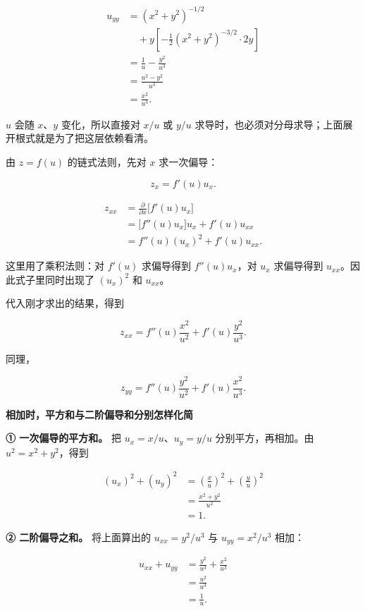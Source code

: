 \documentclass[UTF8,11pt,fontset=windows]{ctexart}
\begin{document}
$$
\begin{aligned}
u_{yy}
&=(x^2+y^2)^{-1/2}\\
&\quad+y\left[-\frac12(x^2+y^2)^{-3/2}\cdot2y\right]\\
&=\frac1u-\frac{y^2}{u^3}\\
&=\frac{u^2-y^2}{u^3}\\
&=\frac{x^2}{u^3}.
\end{aligned}
$$

$u$ 会随 $x$、$y$ 变化，所以直接对 $x/u$ 或 $y/u$ 求导时，也必须对分母求导；上面展开根式就是为了把这层依赖看清。

由 $z=f(u)$ 的链式法则，先对 $x$ 求一次偏导：

$$
z_x=f'(u)u_x.
$$

$$
\begin{aligned}
z_{xx}
&=\frac{\partial}{\partial x}\bigl[f'(u)u_x\bigr]\\
&=\bigl[f''(u)u_x\bigr]u_x+f'(u)u_{xx}\\
&=f''(u)(u_x)^2+f'(u)u_{xx}.
\end{aligned}
$$

这里用了乘积法则：对 $f'(u)$ 求偏导得到 $f''(u)u_x$，对 $u_x$ 求偏导得到 $u_{xx}$。因此式子里同时出现了 $(u_x)^2$ 和 $u_{xx}$。

代入刚才求出的结果，得到

$$
z_{xx}=f''(u)\frac{x^2}{u^2}+f'(u)\frac{y^2}{u^3}.
$$

同理，

$$
z_{yy}=f''(u)\frac{y^2}{u^2}+f'(u)\frac{x^2}{u^3}.
$$

{\bfseries 相加时，平方和与二阶偏导和分别怎样化简\par}
\textbf{① 一次偏导的平方和。} 把 $u_x=x/u$、$u_y=y/u$ 分别平方，再相加。由 $u^2=x^2+y^2$，得到

$$
\begin{aligned}
(u_x)^2+(u_y)^2
&=\left(\frac xu\right)^2+\left(\frac yu\right)^2\\
&=\frac{x^2+y^2}{u^2}\\
&=1.
\end{aligned}
$$

\textbf{② 二阶偏导之和。} 将上面算出的 $u_{xx}=y^2/u^3$ 与 $u_{yy}=x^2/u^3$ 相加：

$$
\begin{aligned}
u_{xx}+u_{yy}
&=\frac{y^2}{u^3}+\frac{x^2}{u^3}\\
&=\frac{u^2}{u^3}\\
&=\frac1u.
\end{aligned}
$$
\end{document}
